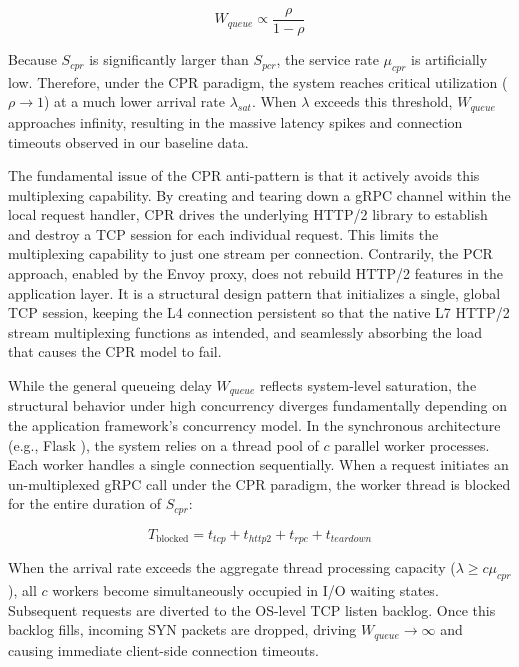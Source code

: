 \documentclass{ieeeaccess}
\begin{document}
	\begin{equation}
		W_{queue} \propto \frac{\rho}{1 - \rho}
	\end{equation}
	
	Because $S_{cpr}$ is significantly larger than $S_{pcr}$, the service rate $\mu_{cpr}$ is artificially low. Therefore, under the CPR paradigm, the system reaches critical utilization ($\rho \to 1$) at a much lower arrival rate $\lambda_{sat}$. When $\lambda$ exceeds this threshold, $W_{queue}$ approaches infinity, resulting in the massive latency spikes and connection timeouts observed in our baseline data.
	
	
	The fundamental issue of the CPR anti-pattern is that it actively avoids this multiplexing capability. By creating and tearing down a gRPC channel within the local request handler, CPR drives the underlying HTTP/2 library to establish and destroy a TCP session for each individual request. This limits the multiplexing capability to just one stream per connection. Contrarily, the PCR approach, enabled by the Envoy proxy, does not rebuild HTTP/2 features in the application layer. It is a structural design pattern that initializes a single, global TCP session, keeping the L4 connection persistent so that the native L7 HTTP/2 stream multiplexing functions as intended, and seamlessly absorbing the load that causes the CPR model to fail.
	
	
	While the general queueing delay $W_{queue}$ reflects system-level saturation, the structural behavior under high concurrency diverges fundamentally depending on the application framework's concurrency model. In the synchronous architecture (e.g., Flask \cite{gunicorn}), the system relies on a thread pool of $c$ parallel worker processes. Each worker handles a single connection sequentially. When a request initiates an un-multiplexed gRPC call under the CPR paradigm, the worker thread is blocked for the entire duration of $S_{cpr}$:
	
	\begin{equation}
		T_{\text{blocked}} = t_{tcp} + t_{http2} + t_{rpc} + t_{teardown}
	\end{equation}
	
	When the arrival rate exceeds the aggregate thread processing capacity ($\lambda \ge c\mu_{cpr}$), all $c$ workers become simultaneously occupied in I/O waiting states. Subsequent requests are diverted to the OS-level TCP listen backlog. Once this backlog fills, incoming SYN packets are dropped, driving $W_{queue} \to \infty$ and causing immediate client-side connection timeouts.
	
\end{document}
